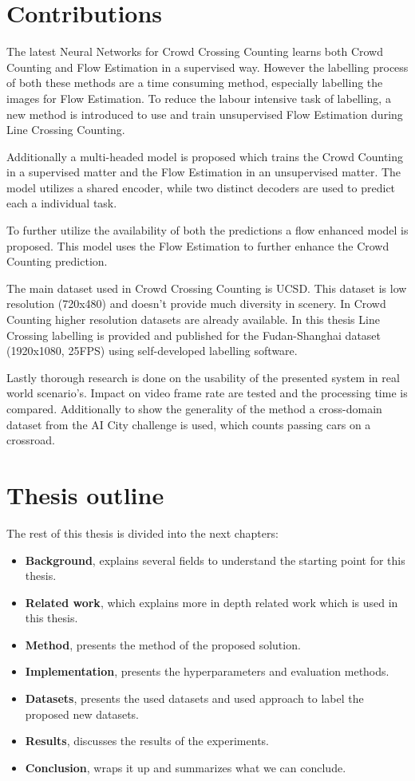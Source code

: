 \section{Contributions}
The latest Neural Networks for Crowd Crossing Counting \cite{leibe_crossing-line_2016} learns both Crowd Counting and Flow Estimation in a supervised way. However the labelling process of both these methods are a time consuming method, especially labelling the images for Flow Estimation. To reduce the labour intensive task of labelling, a new method is introduced to use and train unsupervised Flow Estimation during Line Crossing Counting.

Additionally a multi-headed model is proposed which trains the Crowd Counting in a supervised matter and the Flow Estimation in an unsupervised matter. The model utilizes a shared encoder, while two distinct decoders are used to predict each a individual task.

To further utilize the availability of both the predictions a flow enhanced model is proposed. This model uses the Flow Estimation to further enhance the Crowd Counting prediction.

The main dataset used in Crowd Crossing Counting is UCSD. This dataset is low resolution \cite{Ma2013, ma_counting_2016} (720x480) and doesn't provide much diversity in scenery. In Crowd Counting higher resolution datasets are already available. In this thesis Line Crossing labelling is provided and published for the Fudan-Shanghai dataset (1920x1080, 25FPS) \cite{Fang2019} using self-developed labelling software.

Lastly thorough research is done on the usability of the presented system in real world scenario's. Impact on video frame rate are tested and the processing time is compared. Additionally to show the generality of the method a cross-domain dataset from the AI City challenge is used, which counts passing cars on a crossroad.


\section{Thesis outline}
The rest of this thesis is divided into the next chapters:

 \begin{itemize}
 	\item \textbf{Background}, explains several fields to understand the starting point for this thesis.
    \item \textbf{Related work}, which explains more in depth related work which is used in this thesis.
    \item \textbf{Method}, presents the method of the proposed solution.
    \item \textbf{Implementation}, presents the hyperparameters and evaluation methods.
    \item \textbf{Datasets}, presents the used datasets and used approach to label the proposed new datasets.
    \item \textbf{Results}, discusses the results of the experiments.
    \item \textbf{Conclusion}, wraps it up and summarizes what we can conclude.
 \end{itemize}
